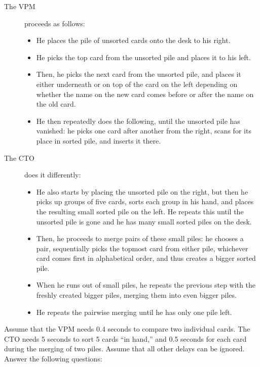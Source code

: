 \documentclass[a4paper]{article}
\newcounter{question}
\begin{document}
\begin{description}
\item[The VPM]
  proceeds as follows:
  \begin{itemize}
  \item
    He places the pile of unsorted cards onto the desk to his right.
  \item
    He picks the top card from the unsorted pile and places it to his left.
  \item
    Then, he picks the next card from the unsorted pile, and places it either underneath or on top of the card on the left depending on whether the name on the new card comes before or after the name on the old card.
  \item
    He then repeatedly does the following, until the unsorted pile has vanished:
    he picks one card after another from the right, scans for its place in sorted pile, and inserts it there.
  \end{itemize}
\item[The CTO]
  does it differently:
  \begin{itemize}
  \item
    He also starts by placing the unsorted pile on the right, but then he picks up groups of five cards, sorts each group in his hand, and places the resulting small sorted pile on the left.
    He repeats this until the unsorted pile is gone and he has many small sorted piles on the desk.
  \item
    Then, he proceeds to merge pairs of these small piles:
    he chooses a pair, sequentially picks the topmost card from either pile, whichever card comes first in alphabetical order, and thus creates a bigger sorted pile.
  \item
    When he runs out of small piles, he repeats the previous step with the freshly created bigger piles, merging them into even bigger piles.
  \item
    He repeats the pairwise merging until he has only one pile left.
  \end{itemize}
\end{description}

Assume that the VPM needs 0.4 seconds to compare two individual cards.
The CTO needs 5 seconds to sort 5 cards ``in hand,'' and 0.5 seconds for each card during the merging of two piles.
Assume that all other delays can be ignored.
Answer the following questions:
\end{document}
